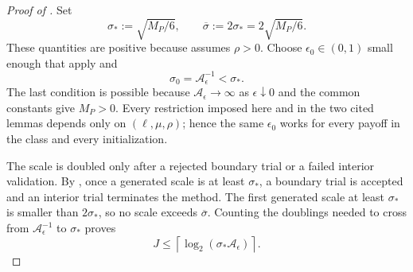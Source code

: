 \documentclass{article}
\begin{document}
\begin{proof}[Proof of ]
Set
\begin{equation}\label{eq:fixed-radius-scale-cap}
 \sigma_*:=\sqrt{M_P/6},
 \qquad
 \overline\sigma:=2\sigma_*=2\sqrt{M_P/6}.
\end{equation}
These quantities are positive because  assumes
$\rho>0$.
Choose $\epsilon_0\in(0,1)$ small enough that
apply and
\begin{equation}\label{eq:initial-scale-below-safe}
 \sigma_0=\mathcal A_\epsilon^{-1}<\sigma_*.
\end{equation}
The last condition is possible because
$\mathcal A_\epsilon\to\infty$ as $\epsilon\downarrow0$ and the
common constants give $M_P>0$.  Every restriction imposed here and in
the two cited lemmas depends only on $(\ell,\mu,\rho)$; hence the same
$\epsilon_0$ works for every payoff in the class and every
initialization.

The scale is doubled only after a rejected boundary trial or a failed
interior validation.  By , once a
generated scale is at least $\sigma_*$, a boundary trial is accepted
and an interior trial terminates the method.  The first generated scale
at least $\sigma_*$ is smaller than $2\sigma_*$, so no scale exceeds
$\overline\sigma$.  Counting the doublings needed to cross from
$\mathcal A_\epsilon^{-1}$ to $\sigma_*$ proves
\begin{equation}\label{eq:fixed-radius-doubling-count}
 J\le
 \left\lceil\log_2(\sigma_*\mathcal A_\epsilon)\right\rceil.
\end{equation}


\end{proof}
\end{document}

